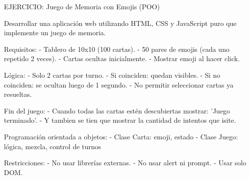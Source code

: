 EJERCICIO: Juego de Memoria con Emojis (POO)

Desarrollar una aplicación web utilizando HTML, CSS y JavaScript puro que implemente un juego
de memoria.

Requisitos:
- Tablero de 10x10 (100 cartas).
- 50 pares de emojis (cada uno repetido 2 veces).
- Cartas ocultas inicialmente.
- Mostrar emoji al hacer click.

Lógica:
- Solo 2 cartas por turno.
- Si coinciden: quedan visibles.
- Si no coinciden: se ocultan luego de 1 segundo.
- No permitir seleccionar cartas ya resueltas.

Fin del juego:
- Cuando todas las cartas estén descubiertas mostrar: 'Juego terminado'.
- Y tambien se tien que mostrar la cantidad de intentos que isite.

Programación orientada a objetos:
- Clase Carta: emoji, estado
- Clase Juego: lógica, mezcla, control de turnos

Restricciones:
- No usar librerías externas.
- No usar alert ni prompt.
- Usar solo DOM.